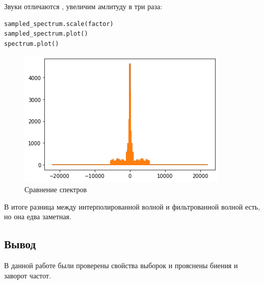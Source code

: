 Звуки отличаются , увеличим амлитуду в три раза:

\begin{lstlisting}[language=Python]
sampled_spectrum.scale(factor)
sampled_spectrum.plot()
spectrum.plot()
\end{lstlisting}
\begin{figure}[H]
	\begin{center}
		\includegraphics[scale=1]{fig/lab11/lab11_7.png}
		\caption{Сравнение спектров}
	\end{center}
\end{figure}

В итоге разница между интерполированной волной и фильтрованной волной есть, но она едва заметная.

\subsection{Вывод}

В данной работе были проверены свойства выборок и прояснены биения и заворот частот.
